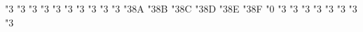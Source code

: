 \def \rrbracket {\delimiter"5\txsycfam 7F\txexafam 13 }
\mathchardef \boxright   "3
\mathchardef \boxleft   "3
\mathchardef \boxdotright   "3
\mathchardef \boxdotleft   "3
\mathchardef \Diamondright   "3
\mathchardef \Diamondleft   "3
\mathchardef \Diamonddotright   "3
\mathchardef \Diamonddotleft   "3
\mathchardef \boxRight   "3
\mathchardef \boxLeft   "3
\mathchardef \boxdotRight   "3\txsycfam 8A
\mathchardef \boxdotLeft   "3\txsycfam 8B
\mathchardef \DiamondRight   "3\txsycfam 8C
\mathchardef \DiamondLeft   "3\txsycfam 8D
\mathchardef \DiamonddotRight   "3\txsycfam 8E
\mathchardef \DiamonddotLeft   "3\txsycfam 8F
\mathchardef \Diamonddot   "0
\mathchardef \circleright   "3
\mathchardef \circleleft   "3
\mathchardef \circleddotright   "3
\mathchardef \circleddotleft   "3
\mathchardef \multimapbothvert   "3
\mathchardef \multimapdotbothvert   "3
\mathchardef \multimapdotbothBvert   "3
\mathchardef \multimapdotbothAvert   "3

   \def\mappedfrom{\leftarrow\mappedfromchar}
   \def\longmappedfrom{\longleftarrow\mappedfromchar}
   \def\Mapsto{\Mapstochar\Rightarrow}
   \def\Longmapsto{\Mapstochar\Longrightarrow}
   \def\Mappedfrom{\Leftarrow\Mappedfromchar}
   \def\Longmappedfrom{\Longleftarrow\Mappedfromchar}
   \def\mmapsto{\mmapstochar\rightarrow}
   \def\longmmapsto{\mmapstochar\longrightarrow}
   \def\mmappedfrom{\leftarrow\mmappedfromchar}
   \def\longmmappedfrom{\longleftarrow\mmappedfromchar}
   \def\Mmapsto{\Mmapstochar\Rightarrow}
   \def\Longmmapsto{\Mmapstochar\Longrightarrow}
   \def\Mmappedfrom{\Leftarrow\Mmappedfromchar}
   \def\Longmmappedfrom{\Longleftarrow\Mmappedfromchar}
   \let\ne=\neq
   \let\notowns=\notni
   \let\lrJoin=\Join
   \let\dasharrow\dashrightarrow
   \let\circledotright\circleddotright
   \let\circledotleft\circleddotleft



